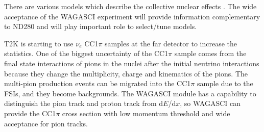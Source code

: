 There are various models which describe the collective nuclear effects \cite{collective_nuclear_effect}.
The wide acceptance of the WAGASCI experiment will provide information complementary to ND280 and will play important role to select/tune models.

T2K is starting to use $\nu_{e}$ CC1$\pi$ samples at the far detector to increase the statistics.
One of the biggest uncertainty of the CC1$\pi$ sample comes from the final state interactions of pions in the nuclei after the initial neutrino interactions because they change the multiplicity, charge and kinematics of the pions.
The multi-pion production events can be migrated into the CC1$\pi$ sample due to the FSIs, and they become backgrounds.
The WAGASCI module has a capability to distinguish the pion track and proton track from d$E$/d$x$, so 
WAGASCI can provide the CC1$\pi$ cross section with low momentum threshold and wide acceptance for pion tracks.




